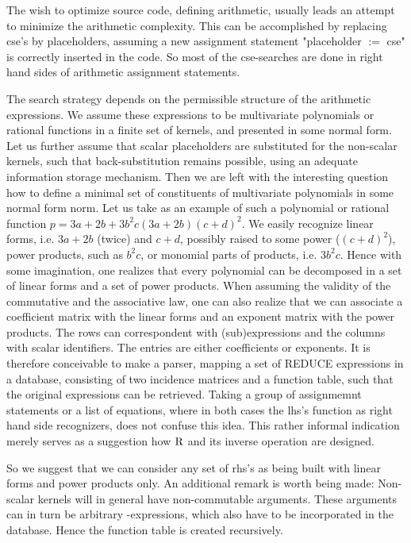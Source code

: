 The wish to optimize source code, defining arithmetic, usually leads an attempt
to minimize the arithmetic complexity. This can be accomplished by replacing
cse's by placeholders, assuming a new assignment
statement "placeholder $:=$ cse" is correctly inserted in the code.
So most of the cse-searches are done in right hand sides of
arithmetic assignment statements.

The search strategy depends on the permissible structure of the arithmetic
expressions. We assume these expressions to be multivariate polynomials
or rational functions in a finite set of kernels, and  presented in some
normal form. Let us further assume that scalar placeholders are substituted
for the non-scalar kernels, such that back-substitution remains possible,
using an adequate information storage mechanism. Then we are left with
the interesting question how to define a minimal set of constituents of
multivariate polynomials in some normal form norm.  Let us take as an
example of such a polynomial or rational function $p = 3a + 2b +  3 {b^2} c
(3a + 2b){(c + d)^2}$.  We easily recognize linear forms, i.e. $3a + 2b$
(twice) and  $c + d$, possibly raised to some power (${(c + d)}^2$), power
products, such as ${b^2} c$, or monomial parts of products, i.e. $3 {b^2} c$.
Hence with some imagination, one realizes that every polynomial can be
decomposed in a set of linear forms and a set of power products. When
assuming the validity of the commutative and the associative law, one can also
realize that we can associate a coefficient matrix with the linear forms and
an exponent matrix with the power products. The rows can correspondent
with (sub)\-ex\-pressions and the columns with scalar identifiers.
The entries are either coefficients or exponents.
It is therefore conceivable to make a parser, mapping a set of REDUCE
expressions in a database, consisting of two
incidence matrices and a function table, such that the original expressions
can be retrieved. Taking a group of assignmemnt statements or a list of
equations, where in both cases the lhs's function as right hand side
recognizers, does not confuse this idea. This rather informal indication
merely serves as a suggestion how ${\rm R}$ and its inverse operation are
designed.

So we suggest that we can consider any set of rhs's as being built with
linear forms and power products only.  An additional remark is worth being
made: Non-scalar kernels will in general have non-commutable arguments.
These arguments  can in turn be arbitrary {\REDUCE}-expressions, which
also have to be incorporated in the database.  Hence the function table
is created recursively.

